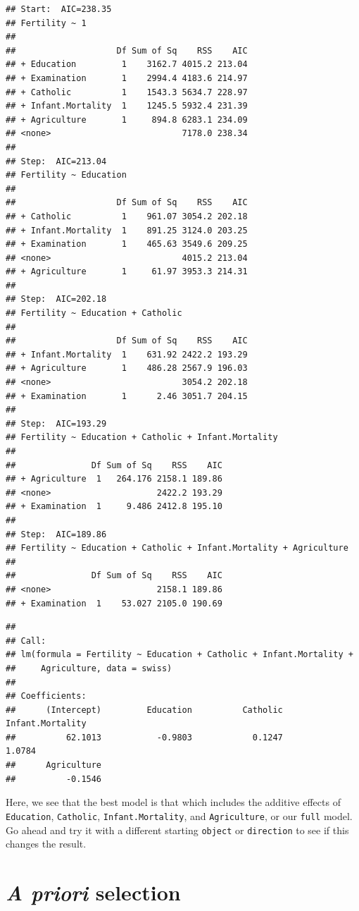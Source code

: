 \documentclass[
]{book}
\begin{document}
\begin{verbatim}
## Start:  AIC=238.35
## Fertility ~ 1
## 
##                    Df Sum of Sq    RSS    AIC
## + Education         1    3162.7 4015.2 213.04
## + Examination       1    2994.4 4183.6 214.97
## + Catholic          1    1543.3 5634.7 228.97
## + Infant.Mortality  1    1245.5 5932.4 231.39
## + Agriculture       1     894.8 6283.1 234.09
## <none>                          7178.0 238.34
## 
## Step:  AIC=213.04
## Fertility ~ Education
## 
##                    Df Sum of Sq    RSS    AIC
## + Catholic          1    961.07 3054.2 202.18
## + Infant.Mortality  1    891.25 3124.0 203.25
## + Examination       1    465.63 3549.6 209.25
## <none>                          4015.2 213.04
## + Agriculture       1     61.97 3953.3 214.31
## 
## Step:  AIC=202.18
## Fertility ~ Education + Catholic
## 
##                    Df Sum of Sq    RSS    AIC
## + Infant.Mortality  1    631.92 2422.2 193.29
## + Agriculture       1    486.28 2567.9 196.03
## <none>                          3054.2 202.18
## + Examination       1      2.46 3051.7 204.15
## 
## Step:  AIC=193.29
## Fertility ~ Education + Catholic + Infant.Mortality
## 
##               Df Sum of Sq    RSS    AIC
## + Agriculture  1   264.176 2158.1 189.86
## <none>                     2422.2 193.29
## + Examination  1     9.486 2412.8 195.10
## 
## Step:  AIC=189.86
## Fertility ~ Education + Catholic + Infant.Mortality + Agriculture
## 
##               Df Sum of Sq    RSS    AIC
## <none>                     2158.1 189.86
## + Examination  1    53.027 2105.0 190.69
\end{verbatim}

\begin{verbatim}
## 
## Call:
## lm(formula = Fertility ~ Education + Catholic + Infant.Mortality + 
##     Agriculture, data = swiss)
## 
## Coefficients:
##      (Intercept)         Education          Catholic  Infant.Mortality  
##          62.1013           -0.9803            0.1247            1.0784  
##      Agriculture  
##          -0.1546
\end{verbatim}

Here, we see that the best model is that which includes the additive effects of \texttt{Education}, \texttt{Catholic}, \texttt{Infant.Mortality}, and \texttt{Agriculture}, or our \texttt{full} model. Go ahead and try it with a different starting \texttt{object} or \texttt{direction} to see if this changes the result.

\hypertarget{a-priori}{%
\section{\texorpdfstring{\emph{A priori} selection}{A priori selection}}\label{a-priori}}
\end{document}

